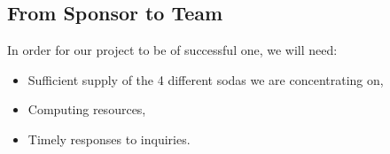 \documentclass[12pt,letterpaper]{article}
\theoremstyle{definition}
\begin{document}
\subsection{From Sponsor to Team} %

In order for our project to be of successful one, we will need:
\begin{itemize}
    \item Sufficient supply of the 4 different sodas we are concentrating on,
    \item Computing resources,
    \item Timely responses to inquiries.
\end{itemize}

%
%
\end{document}
